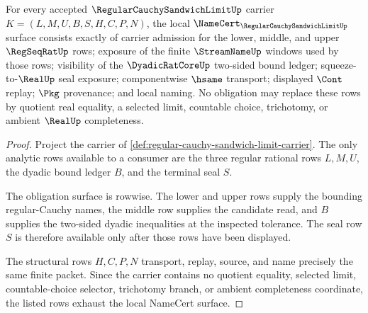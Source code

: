 \begin{theorem}
\label{thm:regular-cauchy-sandwich-limit-namecert-obligations}
For every accepted $\RegularCauchySandwichLimitUp$ carrier $K=(L,M,U,B,S,H,C,P,N)$, the local $\NameCert_{\RegularCauchySandwichLimitUp}$ surface consists exactly of carrier admission for the lower, middle, and upper $\RegSeqRatUp$ rows; exposure of the finite $\StreamNameUp$ windows used by those rows; visibility of the $\DyadicRatCoreUp$ two-sided bound ledger; squeeze-to-$\RealUp$ seal exposure; componentwise $\hsame$ transport; displayed $\Cont$ replay; $\Pkg$ provenance; and local naming. No obligation may replace these rows by quotient real equality, a selected limit, countable choice, trichotomy, or ambient $\RealUp$ completeness.
\end{theorem}
\begin{proof}
Project the carrier of \autoref{def:regular-cauchy-sandwich-limit-carrier}. The only analytic rows available to a consumer are the three regular rational rows $L,M,U$, the dyadic bound ledger $B$, and the terminal seal $S$.

The obligation surface is rowwise. The lower and upper rows supply the bounding regular-Cauchy names, the middle row supplies the candidate read, and $B$ supplies the two-sided dyadic inequalities at the inspected tolerance. The seal row $S$ is therefore available only after those rows have been displayed.

The structural rows $H,C,P,N$ transport, replay, source, and name precisely the same finite packet. Since the carrier contains no quotient equality, selected limit, countable-choice selector, trichotomy branch, or ambient completeness coordinate, the listed rows exhaust the local NameCert surface.
\end{proof}

